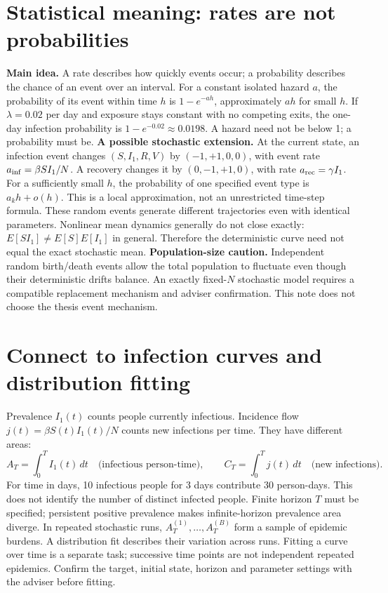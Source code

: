 \documentclass[11pt]{article}
\newcommand{\idea}[1]{\textbf{Main idea.} #1}
\begin{document}
\section{Statistical meaning: rates are not probabilities}
\idea{A rate describes how quickly events occur; a probability describes the chance of an event over an interval.}
For a constant isolated hazard $a$, the probability of its event within time $h$ is $1-e^{-ah}$, approximately $ah$ for small $h$. If $\lambda=0.02$ per day and exposure stays constant with no competing exits, the one-day infection probability is $1-e^{-0.02}\approx0.0198$. A hazard need not be below 1; a probability must be.
\textbf{A possible stochastic extension.} At the current state, an infection event changes $(S,I_1,R,V)$ by $(-1,+1,0,0)$, with event rate $a_{\rm inf}=\beta SI_1/N$. A recovery changes it by $(0,-1,+1,0)$, with rate $a_{\rm rec}=\gamma I_1$. For a sufficiently small $h$, the probability of one specified event type is $a_k h+o(h)$. This is a local approximation, not an unrestricted time-step formula.
These random events generate different trajectories even with identical parameters. Nonlinear mean dynamics generally do not close exactly: $E[SI_1]\ne E[S]E[I_1]$ in general. Therefore the deterministic curve need not equal the exact stochastic mean.
\textbf{Population-size caution.} Independent random birth/death events allow the total population to fluctuate even though their deterministic drifts balance. An exactly fixed-$N$ stochastic model requires a compatible replacement mechanism and adviser confirmation. This note does not choose the thesis event mechanism.
\section{Connect to infection curves and distribution fitting}
Prevalence $I_1(t)$ counts people currently infectious. Incidence flow $j(t)=\beta S(t)I_1(t)/N$ counts new infections per time. They have different areas:
\[
A_T=\int_0^T I_1(t)\,dt\quad\text{(infectious person-time)},\qquad
C_T=\int_0^T j(t)\,dt\quad\text{(new infections)}.
\]
For time in days, 10 infectious people for 3 days contribute 30 person-days. This does not identify the number of distinct infected people. Finite horizon $T$ must be specified; persistent positive prevalence makes infinite-horizon prevalence area diverge.
In repeated stochastic runs, $A_T^{(1)},\ldots,A_T^{(B)}$ form a sample of epidemic burdens. A distribution fit describes their variation across runs. Fitting a curve over time is a separate task; successive time points are not independent repeated epidemics. Confirm the target, initial state, horizon and parameter settings with the adviser before fitting.
\end{document}
